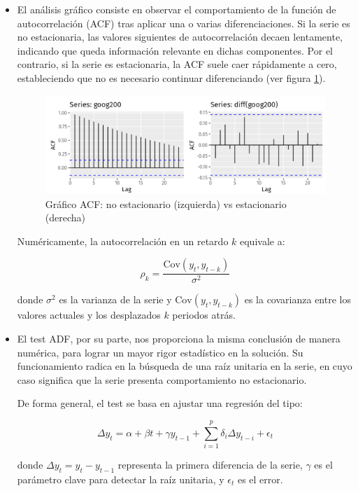 \begin{itemize}
	\item El análisis gráfico consiste en observar el comportamiento de la función de autocorrelación (ACF) tras aplicar una o varias diferenciaciones. Si la serie es no estacionaria, las valores siguientes de autocorrelación decaen lentamente, indicando que queda información relevante en dichas componentes. Por el contrario, si la serie es estacionaria, la ACF suele caer rápidamente a cero, estableciendo que no es necesario continuar diferenciando (ver figura \ref{acf}).  

	\begin{figure}[H] %
		\centering
		\includegraphics[scale=0.25]{img/acf}
		\caption{Gráfico ACF: no estacionario (izquierda) vs estacionario (derecha) \cite{hyndman2021stationarity}}
		\label{acf}
	\end{figure}  	
	
	Numéricamente, la autocorrelación en un retardo \( k \) equivale a:
	
	\[
	\rho_k = \frac{\mathrm{Cov}(y_t, y_{t-k})}{\sigma^2}
	\]
	
	donde \( \sigma^2 \) es la varianza de la serie y \( \mathrm{Cov}(y_t, y_{t-k}) \) es la covarianza entre los valores actuales y los desplazados \( k \) periodos atrás.
	
	
	\item El test ADF, por su parte, nos proporciona la misma conclusión de manera numérica, para lograr un mayor rigor estadístico en la solución. Su funcionamiento radica en la búsqueda de una raíz unitaria en la serie, en cuyo caso significa que la serie presenta comportamiento no estacionario.
	
	De forma general, el test se basa en ajustar una regresión del tipo:
	
	\[
	\Delta y_t = \alpha + \beta t + \gamma y_{t-1} + \sum_{i=1}^{p} \delta_i \Delta y_{t-i} + \epsilon_t
	\]
	
	donde \( \Delta y_t = y_t - y_{t-1} \) representa la primera diferencia de la serie, \( \gamma \) es el parámetro clave para detectar la raíz unitaria, y \( \epsilon_t \) es el error.
	

\end{itemize}
